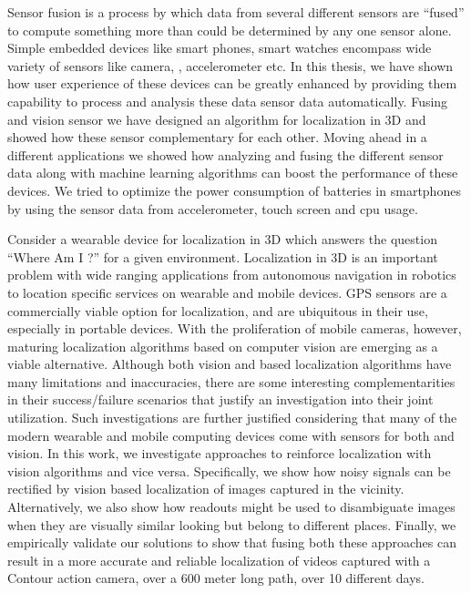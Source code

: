Sensor fusion is a process by which data from several different sensors are ``fused'' to compute something more than could be determined by any one sensor alone. Simple embedded devices like smart phones, smart watches encompass wide variety of sensors like camera, \gps, accelerometer etc. In this 
thesis, we have shown how user experience of these devices can be greatly enhanced by providing them capability to process and analysis these data sensor data automatically. Fusing \gps and vision sensor we have designed an algorithm for localization in 3D and showed how these sensor complementary for 
each other. Moving ahead in a different applications we showed how analyzing and fusing the different 
sensor data along with machine learning algorithms can boost the performance of these devices. We tried to 
optimize the power consumption of batteries in smartphones by using the sensor data from accelerometer, touch screen and cpu usage.

Consider a wearable device for localization in 3D which answers the question ``Where Am I ?'' for a given environment. Localization in 3D is an important problem with wide ranging applications from autonomous navigation in robotics to location specific services on wearable and mobile devices. GPS sensors are a commercially viable option for localization, and are ubiquitous in their use, especially in portable devices. With the proliferation of mobile cameras, however, maturing localization algorithms based on computer vision are emerging as a viable alternative. Although both vision and \gps based localization algorithms have many limitations and inaccuracies, there are some interesting complementarities in their success/failure scenarios that justify an investigation into their joint utilization. Such investigations are further justified considering that many of the modern wearable and mobile computing devices come with sensors for both \gps and vision. In this work, we investigate approaches to reinforce \gps localization with vision algorithms and vice versa. Specifically, we show how noisy \gps signals can be rectified by vision based localization of images captured in the vicinity. Alternatively, we also show how \gps readouts might be used to disambiguate images when they are visually similar looking but belong to different places. Finally, we empirically validate our solutions to show that fusing both these approaches can result in a more accurate and reliable localization of videos captured with a Contour action camera,
over a 600 meter long path, over 10 different days.


